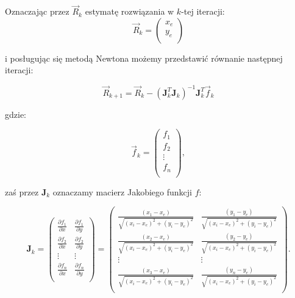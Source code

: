 Oznaczając przez $\vec R_ {k}$ estymatę rozwiązania w $k$-tej iteracji:
\begin{equation}
\vec R_ {k} = \left( \begin{array}{c} 
x_{e} \\
y_{e} \\
\end{array} \right)
\end{equation}

i posługując się metodą Newtona \cite{trilat_przeglad} możemy przedstawić równanie następnej iteracji:

\begin{equation}
\label{eq:trilateracja_iter}
\vec R_ {k+1} = \vec R_ {k} - (\mathbf{J}_{k}^T \mathbf{J}_{k})^{-1} \mathbf{J}_{k}^T \vec f_{k}
\end{equation}

gdzie:

\begin{equation}
\label{eq:f_wektor}
\vec f_{k} = \left( \begin{array}{c} 
f_{1} \\
f_{2} \\
\vdots \\
f_{n} \\
\end{array} \right) ,
\end{equation}

zaś przez $\mathbf{J}_{k}$ oznaczamy macierz Jakobiego funkcji $f$:

\begin{equation}
\label{eq:J_wektor}
\mathbf{J}_{k} = 
\left( \begin{array}{cc} 
  \frac{\partial f_{1} }{\partial x} & \frac{\partial f_{1} }{\partial y} \\
  \frac{\partial f_{2} }{\partial x} & \frac{\partial f_{2} }{\partial y} \\
  \vdots & \vdots \\	
  \frac{\partial f_{n} }{\partial x} & \frac{\partial f_{n} }{\partial y} \\
\end{array} \right) = 
\left( \begin{array}{cc} 
  \frac{(x_1 - x_e) }{\sqrt{(x_i - x_e)^2 + (y_i-y_e)^2}} & \frac{(y_1 - y_e) }{\sqrt{(x_i - x_e)^2 + (y_i-y_e)^2}} \\
  \frac{(x_2 - x_e) }{\sqrt{(x_i - x_e)^2 + (y_i-y_e)^2}} & \frac{(y_2 - y_e)  }{\sqrt{(x_i - x_e)^2 + (y_i-y_e)^2}} \\
  \vdots & \vdots \\	
  \frac{(x_3 - x_e)}{\sqrt{(x_i - x_e)^2 + (y_i-y_e)^2}} & \frac{(y_n - y_e)  }{\sqrt{(x_i - x_e)^2 + (y_i-y_e)^2}} \\
\end{array} \right).
\end{equation}

